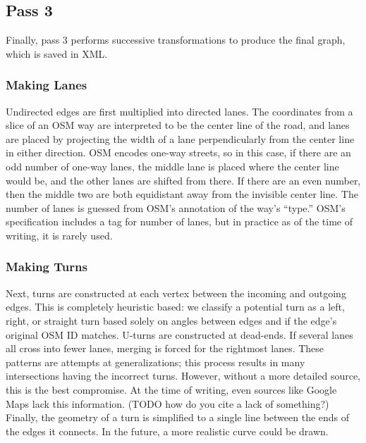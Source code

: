 \documentclass[letterpaper, 10 pt, conference]{ieeeconf}  %
\begin{document}
{\subsection{Pass 3}

Finally, pass 3 performs successive transformations to produce the final graph,
which is saved in XML.

\subsubsection{Making Lanes}


Undirected edges are first multiplied into directed lanes. The coordinates from
a slice of an OSM way are interpreted to be the center line of the road, and
lanes are placed by projecting the width of a lane perpendicularly from the
center line in either direction. OSM encodes one-way streets, so in this case,
if there are an odd number of one-way lanes, the middle lane is placed where the
center line would be, and the other lanes are shifted from there. If there are
an even number, then the middle two are both equidistant away from the invisible
center line. The number of lanes is guessed from OSM's annotation of the way's
``type.'' OSM's specification includes a tag for number of lanes, but in
practice as of the time of writing, it is rarely used.

\subsubsection{Making Turns}

Next, turns are constructed at each vertex between the incoming and outgoing
edges. This is completely heuristic based: we classify a potential turn as a
left, right, or straight turn based solely on angles between edges and if the
edge's original OSM ID matches. U-turns are constructed at dead-ends. If several
lanes all cross into fewer lanes, merging is forced for the rightmost lanes.
These patterns are attempts at generalizations; this process results in many
intersections having the incorrect turns. However, without a more detailed
source, this is the best compromise. At the time of writing, even sources like
Google Maps lack this information. (TODO how do you cite a lack of something?)
Finally, the geometry of a turn is simplified to a single line between the ends
of the edges it connects.  In the future, a more realistic curve could be drawn.

}
\end{document}

